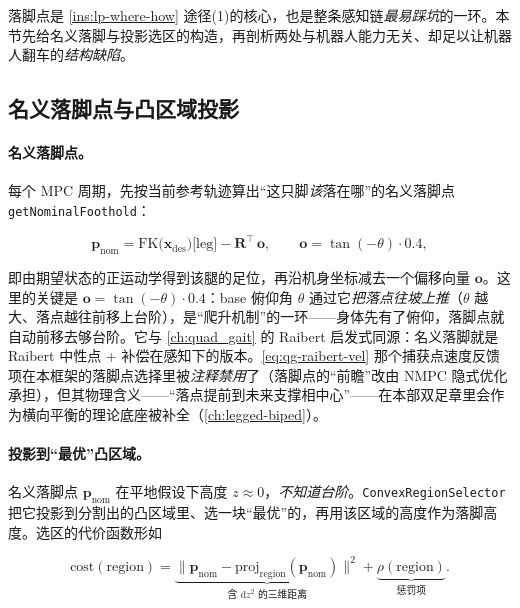 落脚点是 \cref{ins:lp-where-how} 途径(1)的核心，也是整条感知链\emph{最易踩坑}的一环。本节先给名义落脚与投影选区的构造，再剖析两处与机器人能力无关、却足以让机器人翻车的\emph{结构缺陷}。

\subsection{名义落脚点与凸区域投影}
\label{subsec:lp-nominal}

\paragraph{名义落脚点。}
每个 MPC 周期，先按当前参考轨迹算出“这只脚\emph{该}落在哪”的名义落脚点 \texttt{getNominalFoothold}：

\begin{equation}
  \mathbf{p}_{\mathrm{nom}} = \mathrm{FK}\big(\mathbf{x}_{\mathrm{des}}\big)\big[\text{leg}\big] - \mathbf{R}^\top\,\mathbf{o},
  \qquad
  \mathbf{o} = \tan(-\theta)\cdot 0.4,
  \label{eq:lp-nominal}
\end{equation}

即由期望状态的正运动学得到该腿的足位，再沿机身坐标减去一个偏移向量 $\mathbf{o}$。这里的关键是 $\mathbf{o}=\tan(-\theta)\cdot 0.4$：base 俯仰角 $\theta$ 通过它\emph{把落点往坡上推}（$\theta$ 越大、落点越往前移上台阶），是“爬升机制”的一环——身体先有了俯仰，落脚点就自动前移去够台阶。它与 \cref{ch:quad_gait} 的 Raibert 启发式同源：名义落脚就是 Raibert 中性点 + 补偿在感知下的版本。\cref{eq:qg-raibert-vel} 那个捕获点速度反馈项在本框架的落脚点选择里被\emph{注释禁用}了（落脚点的“前瞻”改由 NMPC 隐式优化承担），但其物理含义——“落点提前到未来支撑相中心”——在本部双足章里会作为横向平衡的理论底座被补全（\cref{ch:legged-biped}）。

\paragraph{投影到“最优”凸区域。}
名义落脚点 $\mathbf{p}_{\mathrm{nom}}$ 在平地假设下高度 $z\approx 0$，\emph{不知道台阶}。\texttt{ConvexRegionSelector} 把它投影到分割出的凸区域里、选一块“最优”的，再用该区域的高度作为落脚高度。选区的代价函数形如

\begin{equation}
  \text{cost}(\text{region}) = \underbrace{\big\| \mathbf{p}_{\mathrm{nom}} - \mathrm{proj}_{\text{region}}(\mathbf{p}_{\mathrm{nom}})\big\|^2}_{\text{含 } \mathrm{d}z^2 \text{ 的三维距离}} + \underbrace{\rho(\text{region})}_{\text{惩罚项}}.
  \label{eq:lp-region-cost}
\end{equation}

